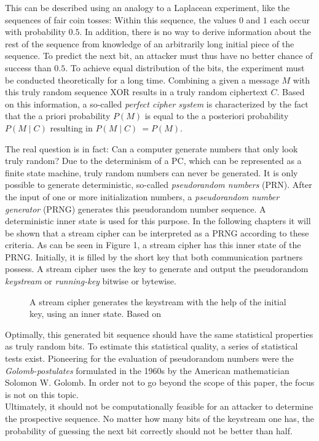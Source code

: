 This can be described using an analogy to a Laplacean experiment, like the sequences of fair coin tosses: Within this sequence, the values $0$ and $1$ each occur with probability $0.5$. In addition, there is no way to derive information about the rest of the sequence from knowledge of an arbitrarily long initial piece of the sequence. To predict the next bit, an attacker must thus have no better chance of success than $0.5$. To achieve equal distribution of the bits, the experiment must be conducted theoretically for a long time. Combining a given a message $M$ with this truly random sequence XOR results in a truly random ciphertext $C$. Based on this information, a so-called \textit{perfect cipher system} is characterized by the fact that the a priori probability $P\left(M\right)$ is equal to the a posteriori probability $P({M}\mid{C})$ resulting in $P({M}\mid{C})\ = P({M})$. \cite[pp. 52-23]{Ertel.2020}

\pagebreak

The real question is in fact: Can a computer generate numbers that only look truly random? Due to the determinism of a PC, which can be represented as a finite state machine, truly random numbers can never be generated. It is only possible to generate deterministic, so-called \textit{pseudorandom numbers} (PRN). After the input of one or more initialization numbers, a \textit{pseudorandom number generator} (PRNG) generates this pseudorandom number sequence. A deterministic inner state is used for this purpose. \cite[pp. 195-196]{Ertel.2020} In the following chapters it will be shown that a stream cipher can be interpreted as a PRNG according to these criteria. As can be seen in Figure 1, a stream cipher has this inner state of the PRNG. Initially, it is filled by the short key that both communication partners possess. A stream cipher uses the key to generate and output the pseudorandom \textit{keystream} or \textit{running-key} bitwise or bytewise. \cite[p. 233]{Schneier.2006} \\

\begin{figure}[h]
	\centering
	
	\caption{A stream cipher generates the keystream with the help of the initial key, using an inner state. Based on \cite[p. 234]{Schneier.2006}}
	\label{fig:Figure_2}
\end{figure}

Optimally, this generated bit sequence should have the same statistical properties as truly random bits. To estimate this statistical quality, a series of statistical tests exist. Pioneering for the evaluation of pseudorandom numbers were the \textit{Golomb-postulates} formulated in the 1960s by the American mathematician Solomon W. Golomb. \cite[p. 43]{Golomb.1967} In order not to go beyond the scope of this paper, the focus is not on this topic.\\

Ultimately, it should not be computationally feasible for an attacker to determine the prospective  sequence. No matter how many bits of the keystream one has, the probability of guessing the next bit correctly should not be better than half.
